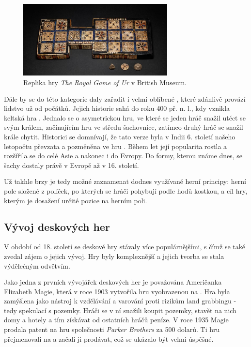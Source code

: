 \begin{figure}[h]
    \centering
    \includegraphics[width=0.7\textwidth]{figures/images/royal-game-of-ur-british-museum.jpg}
    \caption{Replika hry \textit{The Royal Game of Ur} v British Museum. \cite{british_museum_2021}}
    \label{fig:royal_game_of_ur}
\end{figure}

Dále by se do této kategorie daly zařadit i velmi oblíbené \textbf{}, které zdánlivě provází lidstvo už od počátků. Jejich historie sahá do roku 400 př. n. l., kdy vznikla keltská hra . Jednalo se o asymetrickou hru, ve které se jeden hráč snažil utéct se svým králem, začínajícím hru ve středu šachovnice, zatímco druhý hráč se snažil krále chytit. Historici se domnívají, že tato verze byla v Indii 6. století našeho letopočtu převzata a pozměněna ve hru . Během let její popularita rostla a rozšířila se do celé Asie a nakonec i do Evropy. Do formy, kterou známe dnes, se šachy dostaly právě v Evropě až v 16. století. \cite{chess_com_2023}

Už takhle brzy je tedy možné zaznamenat dodnes využívané herní principy: herní pole složené z políček, po kterých se hráči pohybují podle hodů kostkou, a cíl hry, kterým je dosažení určité pozice na herním poli. \cite{attia_2018}

\subsection{Vývoj deskových her}
\label{subsec:development}

V období od 18. století se deskové hry stávaly více populárnějšími, s čímž se také zvedal zájem o jejich vývoj. Hry byly komplexnější a jejich tvorba se stala výdělečným odvětvím.

Jako jedna z prvních vývojářek deskových her je považována Američanka Elizabeth Magie, která v roce 1903 vytvořila hru  vyobrazenou na . Hra byla zamýšlena jako nástroj k vzdělávání a varování proti rizikům land grabbingu - tedy spekulací s pozemky. Hráči se v ní snažili koupit pozemky, stavět na nich domy a hotely a tím získávat od ostatních hráčů peníze. V roce 1935 Magie prodala patent na hru společnosti \textit{Parker Brothers} za 500 dolarů. Ti hru přejmenovali na \textbf{} a začali ji prodávat, což se ukázalo být velmi úspěšné. \cite{attia_2018}

